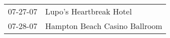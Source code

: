 \begin{supertabular}{p{0.07\textwidth}p{0.23\textwidth}}
 07-27-07 &        Lupo's Heartbreak Hotel \\
 07-28-07 &  Hampton Beach Casino Ballroom \\
\end{supertabular}
